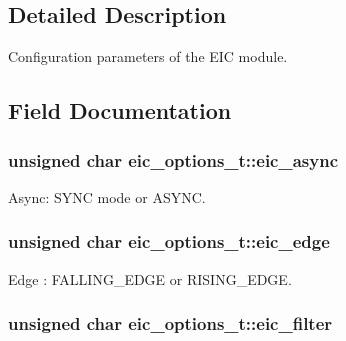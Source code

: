\subsection{\-Detailed \-Description}
\-Configuration parameters of the \-E\-I\-C module. 

\subsection{\-Field \-Documentation}
\hypertarget{structeic__options__t_a578bdd7db1a8f7e9fe1d2460cb58fa44}{
\subsubsection[{eic\-\_\-async}]{\setlength{\rightskip}{0pt plus 5cm}unsigned char {\bf eic\-\_\-options\-\_\-t\-::eic\-\_\-async}}}
\label{structeic__options__t_a578bdd7db1a8f7e9fe1d2460cb58fa44}


\-Async\-: \-S\-Y\-N\-C mode or \-A\-S\-Y\-N\-C. 

\hypertarget{structeic__options__t_ae6338e7a428378643000dfecaa808ab3}{
\subsubsection[{eic\-\_\-edge}]{\setlength{\rightskip}{0pt plus 5cm}unsigned char {\bf eic\-\_\-options\-\_\-t\-::eic\-\_\-edge}}}
\label{structeic__options__t_ae6338e7a428378643000dfecaa808ab3}


\-Edge \-: \-F\-A\-L\-L\-I\-N\-G\-\_\-\-E\-D\-G\-E or \-R\-I\-S\-I\-N\-G\-\_\-\-E\-D\-G\-E. 

\hypertarget{structeic__options__t_ae1766941c964d8a36fa38110945d609f}{
\subsubsection[{eic\-\_\-filter}]{\setlength{\rightskip}{0pt plus 5cm}unsigned char {\bf eic\-\_\-options\-\_\-t\-::eic\-\_\-filter}}}
\label{structeic__options__t_ae1766941c964d8a36fa38110945d609f}


